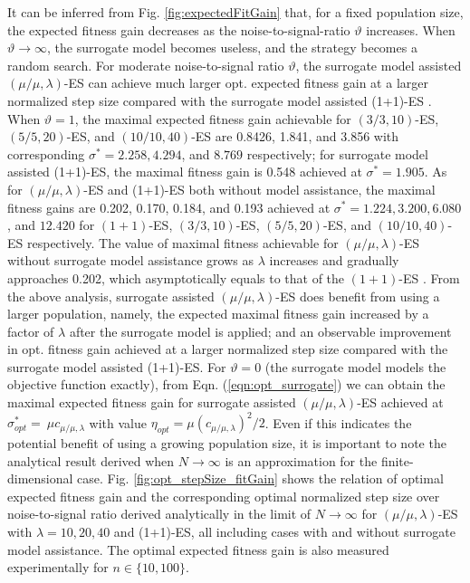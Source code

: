 
It can be inferred from Fig. \ref{fig:expectedFitGain} that, for a fixed population size, the expected fitness gain decreases as the noise-to-signal-ratio $\vartheta$ increases. When $\vartheta \rightarrow \infty$, the surrogate model becomes useless, and the strategy becomes a random search. For moderate noise-to-signal ratio $\vartheta$, the surrogate model assisted $(\mu/\mu,\lambda)$-ES can achieve much larger opt. expected fitness gain at a larger normalized step size compared with the surrogate model assisted (1+1)-ES \cite{DBLP:conf/ppsn/KayhaniA18}. When $\vartheta = 1$, the maximal expected fitness gain achievable for $(3/3,10)$-ES, $(5/5,20)$-ES, and $(10/10,40)$-ES are 0.8426, 1.841, and 3.856 with corresponding $\sigma^*=2.258,4.294$, and $8.769$ respectively; for surrogate model assisted (1+1)-ES, the maximal fitness gain is 0.548 achieved at $\sigma^* = 1.905$. As for $(\mu/\mu,\lambda)$-ES and (1+1)-ES both without model assistance, the maximal fitness gains are 0.202, 0.170, 0.184, and 0.193 achieved at $\sigma^*=1.224,3.200,6.080$, and $12.420$ for $(1+1)$-ES, $(3/3,10)$-ES, $(5/5,20)$-ES, and $(10/10,40)$-ES respectively. The value of maximal fitness achievable for $(\mu/\mu,\lambda)$-ES without surrogate model assistance grows as $\lambda$ increases and gradually approaches 0.202, which asymptotically equals to that of the $(1+1)$-ES \cite{Beyer:1995:TTE:1326683.1326688}. From the above analysis, surrogate assisted $(\mu/\mu,\lambda)$-ES does benefit from using a larger population, namely, the expected maximal fitness gain increased by a factor of $\lambda$ after the surrogate model is applied; and an observable improvement in opt. fitness gain achieved at a larger normalized step size compared with the surrogate model assisted (1+1)-ES. For $\vartheta=0$ (the surrogate model models the objective function exactly), from Eqn. (\ref{eqn:opt_surrogate}) we can obtain the maximal expected fitness gain for surrogate assisted $(\mu/\mu,\lambda)$-ES achieved at $\sigma^*_{opt} = \ \mu c_{\mu / \mu, \lambda}$ with value $\eta_{opt} =  \mu (c_{\mu / \mu, \lambda})^2/2$. Even if this indicates the potential benefit of using a growing population size, it is important to note the analytical result derived when $N \rightarrow \infty$ is an approximation for the finite-dimensional case. Fig. \ref{fig:opt_stepSize_fitGain} shows the relation of optimal expected fitness gain and the corresponding optimal normalized step size over noise-to-signal ratio derived analytically in the limit of $N \rightarrow \infty$ for $(\mu/\mu,\lambda)$-ES with $\lambda=10,20,40$ and (1+1)-ES, all including cases with and without surrogate model assistance. The optimal expected fitness gain is also measured experimentally for $n \in \{10,100 \}$. 
   
